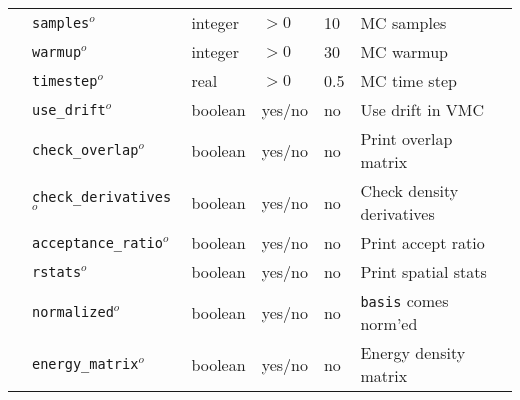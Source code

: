 \begin{table}[h]
\begin{center}
\begin{tabularx}{\textwidth}{l l l l l l }
   &\texttt{samples}$^o$       &  integer      & $>0$             & 10                  & MC samples            \\
   &\texttt{warmup}$^o$        &  integer      & $>0$             & 30                  & MC warmup             \\
   &\texttt{timestep}$^o$      &  real         & $>0$             & 0.5                 & MC time step          \\
   &\texttt{use\_drift}$^o$    &  boolean      &  yes/no          & no                  & Use drift in VMC      \\
   &\texttt{check\_overlap}$^o$&  boolean      &  yes/no          & no                  & Print overlap matrix  \\
   &\texttt{check\_derivatives}$^o$& boolean   &  yes/no          & no                  & Check density derivatives \\
   &\texttt{acceptance\_ratio}$^o$&  boolean   &  yes/no          & no                  & Print accept ratio    \\
   &\texttt{rstats}$^o$        &  boolean      &  yes/no          & no                  & Print spatial stats   \\
   &\texttt{normalized}$^o$    &  boolean      &  yes/no          & no                  & \texttt{basis} comes norm'ed \\
   &\texttt{energy\_matrix}$^o$&  boolean      & yes/no           & no                  & Energy density matrix \\
  \hline
\end{tabularx}
\end{center}
\end{table}
\FloatBarrier

